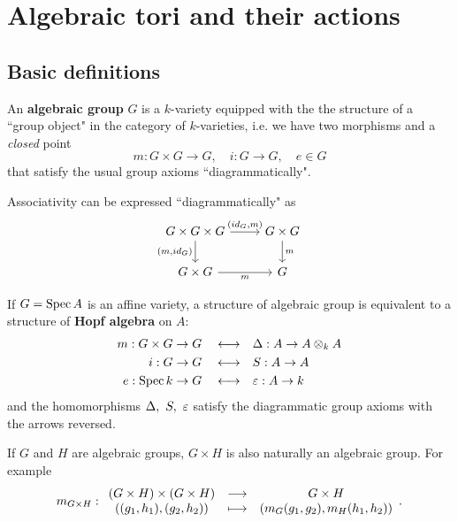 \chapter{Algebraic tori and their actions}

\section{Basic definitions}
\begin{definition}
An \textbf{algebraic group} $G$ is a $k$-variety equipped with the the structure of a ``group object" in the category of $k$-varieties, i.e. we have two morphisms and a \textit{closed} point
\[m:G\times G\to G,\quad i:G\to G,\quad e\in G\]
that satisfy the usual group axioms ``diagrammatically".
\end{definition}

\begin{example}
Associativity can be expressed ``diagrammatically" as
\[\begin{tikzcd}
	{G\times G\times G} & {G\times G} \\
	{G\times G} & G
	\arrow["{(id_G,m)}", from=1-1, to=1-2]
	\arrow["{(m,id_G)}"', from=1-1, to=2-1]
	\arrow["m", from=1-2, to=2-2]
	\arrow["m"', from=2-1, to=2-2]
\end{tikzcd}\]
\end{example}

\begin{remark}
If $G=\operatorname{Spec} A$ is an affine variety, a structure of algebraic group is equivalent to a structure of \textbf{Hopf algebra} on $A$:
\begin{align*}
m:G\times G\to G\quad\longleftrightarrow& \quad\Delta:A\to A\otimes_k A\\
i:G\to G\quad\longleftrightarrow& \quad S:A\to  A\\
e:\operatorname{Spec} k\to G\quad\longleftrightarrow& \quad\varepsilon:A\to k
\end{align*}
and the homomorphisms $\Delta,\ S,\ \varepsilon$ satisfy the diagrammatic group axioms with the arrows reversed.
\end{remark}

\begin{remark}
If $G$ and $H$ are algebraic groups, $G\times H$ is also naturally an algebraic group. For example 
\[m_{G\times H}:\begin{array}{ccc} {(G\times H)\times (G\times H)} & \longrightarrow & {G\times H}\\ {((g_1,h_1),(g_2,h_2))} & \longmapsto & {(m_G(g_1,g_2),m_H(h_1,h_2))} \end{array}.\]
\end{remark}

